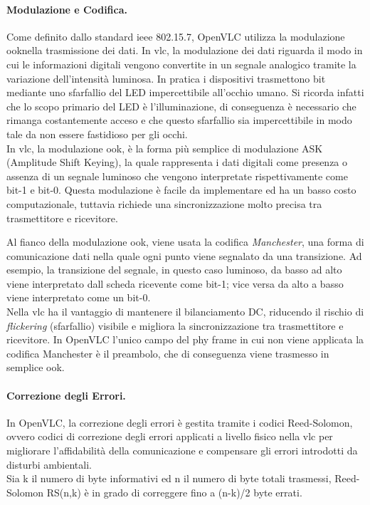 \paragraph{Modulazione e Codifica.}
\noindent Come definito dallo standard \gls{ieee} 802.15.7, OpenVLC utilizza la modulazione \gls{ook}\glsfirstoccur nella trasmissione dei dati. In \gls{vlc}, la modulazione dei dati riguarda il modo in cui le informazioni digitali vengono convertite in un segnale analogico tramite la variazione dell'intensità luminosa. In pratica i dispositivi trasmettono bit mediante uno sfarfallio del LED impercettibile all'occhio umano. Si ricorda infatti che lo scopo primario del LED è l'illuminazione, di conseguenza è necessario che rimanga costantemente acceso e che questo sfarfallio sia impercettibile in modo tale da non essere fastidioso per gli occhi.\\
In \gls{vlc}, la modulazione \gls{ook}, è la forma più semplice di modulazione ASK (Amplitude Shift Keying), la quale rappresenta i dati digitali come presenza o assenza di un segnale luminoso che vengono interpretate rispettivamente come bit-1 e bit-0. Questa modulazione è facile da implementare ed ha un basso costo computazionale, tuttavia richiede una sincronizzazione molto precisa tra trasmettitore e ricevitore.

Al fianco della modulazione \gls{ook}, viene usata la codifica \textit{Manchester}, una forma di comunicazione dati nella quale ogni punto viene segnalato da una transizione. Ad esempio, la transizione del segnale, in questo caso luminoso, da basso ad alto viene interpretato dall scheda ricevente come bit-1; vice versa da alto a basso viene interpretato come un bit-0.\\
Nella \gls{vlc} ha il vantaggio di mantenere il bilanciamento DC, riducendo il rischio di \textit{flickering} (sfarfallio) visibile e migliora la sincronizzazione tra trasmettitore e ricevitore.
In OpenVLC l'unico campo del \gls{phy} frame in cui non viene applicata la codifica Manchester è il preambolo, che di conseguenza viene trasmesso in semplice \gls{ook}.

\paragraph{Correzione degli Errori.}
In OpenVLC, la correzione degli errori è gestita tramite i codici Reed-Solomon, ovvero codici di correzione degli errori applicati a livello fisico nella \gls{vlc} per migliorare l'affidabilità della comunicazione e compensare gli errori introdotti da disturbi ambientali.\\
Sia k il numero di byte informativi ed n il numero di byte totali trasmessi, Reed-Solomon RS(n,k) è in grado di correggere fino a (n-k)/2 byte errati.

